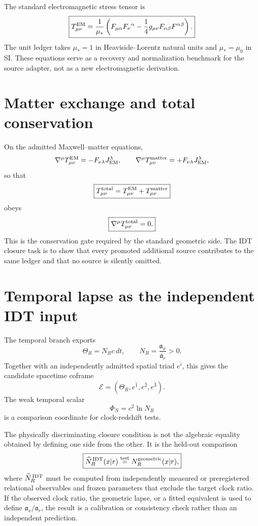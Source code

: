 The standard electromagnetic stress tensor is
\[
\boxed{
T^{\rm EM}_{\mu\nu}
=
\frac{1}{\mu_*}
\left(
F_{\mu\alpha}F_{\nu}{}^{\alpha}
-\frac14g_{\mu\nu}F_{\alpha\beta}F^{\alpha\beta}
\right).
}
\]
The unit ledger takes \(\mu_*=1\) in Heaviside--Lorentz natural units and \(\mu_*=\mu_0\) in SI. These equations serve as a recovery and normalization benchmark for the source adapter, not as a new electromagnetic derivation.

\section{Matter exchange and total conservation}

On the admitted Maxwell--matter equations,
\[
\nabla^\mu T^{\rm EM}_{\mu\nu}
=-F_{\nu\lambda}J_{\rm EM}^{\lambda},
\qquad
\nabla^\mu T^{\rm matter}_{\mu\nu}
=+F_{\nu\lambda}J_{\rm EM}^{\lambda},
\]
so that
\[
\boxed{
T^{\rm total}_{\mu\nu}
=T^{\rm EM}_{\mu\nu}+T^{\rm matter}_{\mu\nu}
}
\]
obeys
\[
\boxed{\nabla^\mu T^{\rm total}_{\mu\nu}=0.}
\]
This is the conservation gate required by the standard geometric side. The IDT closure task is to show that every promoted additional source contributes to the same ledger and that no source is silently omitted.

\section{Temporal lapse as the independent IDT input}

The temporal branch exports
\[
\Theta_R=N_Rc\,dt,
\qquad
N_R=\frac{\mathfrak a_x}{\mathfrak a_r}>0.
\]
Together with an independently admitted spatial triad \(e^{\hat i}\), this gives the candidate spacetime coframe
\[
\mathcal E=(\Theta_R,e^{\hat1},e^{\hat2},e^{\hat3}).
\]
The weak temporal scalar
\[
\Phi_N=c^2\ln N_R
\]
is a comparison coordinate for clock-redshift tests.

The physically discriminating closure condition is not the algebraic equality obtained by defining one side from the other. It is the held-out comparison
\[
\boxed{
\widehat N_R^{\,\rm IDT}(x|r)
\stackrel{\rm test}{=}
N_R^{\rm geometric}(x|r),
}
\]
where \(\widehat N_R^{\,\rm IDT}\) must be computed from independently measured or preregistered relational observables and frozen parameters that exclude the target clock ratio. If the observed clock ratio, the geometric lapse, or a fitted equivalent is used to define \(\mathfrak a_x/\mathfrak a_r\), the result is a calibration or consistency check rather than an independent prediction.

